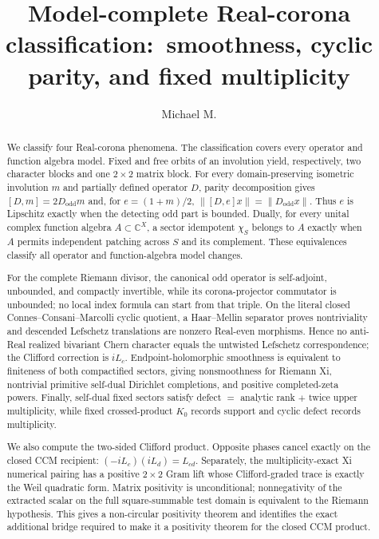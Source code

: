 \documentclass[11pt,reqno]{amsart}
\title[Model-complete Real-corona classification]{Model-complete Real-corona classification:\
smoothness, cyclic parity, and fixed multiplicity}
\author{Michael M.}
\newcommand{\C}{\mathbb C}
\begin{document}
\begin{abstract}
We classify four Real-corona phenomena.  The classification covers every operator and function
algebra model.  Fixed and free orbits of
an involution yield, respectively, two character blocks and one $2\times2$ matrix block.  For every
domain-preserving isometric involution $m$ and partially defined operator $D$, parity decomposition
gives $[D,m]=2D_{\mathrm{odd}}m$ and, for $e=(1+m)/2$,
$\|[D,e]x\|=\|D_{\mathrm{odd}}x\|$.  Thus $e$ is Lipschitz exactly when the detecting odd part is
bounded.  Dually, for every unital complex function algebra $A\subset\C^X$, a sector idempotent
$\chi_S$ belongs to $A$ exactly when $A$ permits independent patching across $S$ and its
complement.  These equivalences classify all operator and function-algebra model changes.

For the complete Riemann divisor, the canonical odd operator is self-adjoint, unbounded, and
compactly invertible, while its corona-projector commutator is unbounded; no local index formula
can start from that triple.  On the literal closed Connes--Consani--Marcolli cyclic quotient, a
Haar--Mellin separator proves nontriviality and descended Lefschetz translations are nonzero
Real-even morphisms.  Hence no anti-Real realized bivariant Chern character equals the untwisted
Lefschetz correspondence; the Clifford correction is $iL_c$.  Endpoint-holomorphic smoothness is
equivalent to finiteness of both compactified sectors, giving nonsmoothness for Riemann Xi,
nontrivial primitive self-dual Dirichlet completions, and positive completed-zeta powers.  Finally,
self-dual fixed sectors satisfy defect $=$ analytic rank $+$ twice upper multiplicity, while fixed
crossed-product $K_0$ records support and cyclic defect records multiplicity.

We also compute the two-sided Clifford product.  Opposite phases cancel exactly on the closed CCM
recipient: $(-iL_c)(iL_d)=L_{cd}$.  Separately, the multiplicity-exact Xi numerical pairing has a
positive $2\times2$ Gram lift whose Clifford-graded trace is exactly the Weil quadratic form.
Matrix positivity is unconditional; nonnegativity of the extracted scalar on the full
square-summable test domain is equivalent to the Riemann hypothesis.  This gives a non-circular
positivity theorem and identifies the exact additional bridge required to make it a positivity
theorem for the closed CCM product.
\end{abstract}

\maketitle
\tableofcontents
\end{document}
